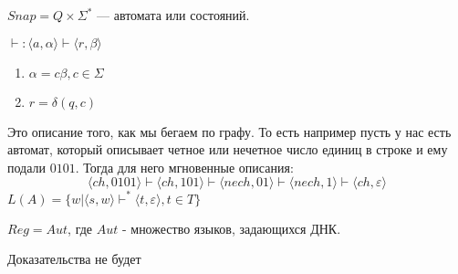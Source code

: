 $Snap = Q \times \Sigma^*$ ---  автомата или состояний. 

$\vdash: \langle a, \alpha \rangle \vdash \langle r,\beta\rangle$
\begin{enumerate}
    \item $\alpha = c\beta , c \in \Sigma$
    \item $r = \delta( q,c)$
\end{enumerate}

Это описание того, как мы бегаем по графу. То есть например пусть у нас есть автомат, который описывает четное или нечетное число единиц в строке и ему подали $0101$. Тогда для него мгновенные описания:
$$\langle ch, 0101\rangle \vdash \langle ch, 101\rangle \vdash \langle nech, 01\rangle \vdash \langle nech , 1\rangle \vdash \langle ch, \varepsilon\rangle$$
 $L(A) = \{w | \langle s,w\rangle \vdash^* \langle t, \varepsilon\rangle, t \in T\}$


$Reg = Aut$, где $Aut$ - множество языков, задающихся ДНК.

Доказательства не будет
